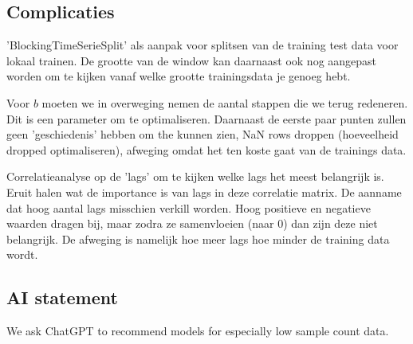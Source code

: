 \documentclass{article}
\begin{document}
\subsection*{Complicaties}
'BlockingTimeSerieSplit' als aanpak voor splitsen van de training test data voor lokaal trainen.
De grootte van de window kan daarnaast ook nog aangepast worden om te kijken vanaf welke grootte
trainingsdata je genoeg hebt. 

Voor $b$ moeten we in overweging nemen de aantal stappen die we terug redeneren. Dit is een
parameter om te optimaliseren. Daarnaast de eerste paar punten zullen geen 'geschiedenis' 
hebben om the kunnen zien, NaN rows droppen (hoeveelheid dropped optimaliseren), afweging 
omdat het ten koste gaat van de trainings data. 

Correlatieanalyse op de 'lags' om te kijken welke lags het meest belangrijk is. Eruit halen
wat de importance is van lags in deze correlatie matrix. De aanname dat hoog aantal lags 
misschien verkill worden. Hoog positieve en negatieve waarden dragen bij, maar zodra ze 
samenvloeien (naar $0$) dan zijn deze niet belangrijk. De afweging is namelijk hoe meer lags 
hoe minder de training data wordt.

\subsection*{AI statement}
We ask ChatGPT to recommend models for especially low sample count data. 
\end{document}
